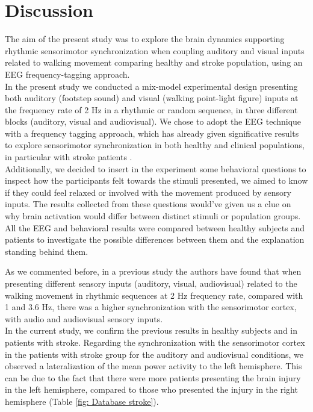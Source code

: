 \chapter{Discussion}
The aim of the present study was to explore the brain dynamics supporting rhythmic sensorimotor synchronization when coupling auditory and visual inputs related to walking movement comparing healthy and stroke population, using an EEG frequency-tagging approach. \\
In the present study we conducted a mix-model experimental design presenting both auditory (footstep sound) and visual (walking point-light figure) inputs at the frequency rate of 2 Hz in a rhythmic or random sequence, in three different blocks (auditory, visual and audiovisual). We chose to adopt the EEG technique with a frequency tagging approach, which has already given significative results to explore sensorimotor synchronization in both healthy \parencite{Cracco_2022} and clinical populations, in particular with stroke patients \parencite{Nozaradan_2017}. \\
Additionally, we decided to insert in the experiment some behavioral questions to inspect how the participants felt towards the stimuli presented, we aimed to know if they could feel relaxed or involved with the movement produced by sensory inputs. The results collected from these questions would've given us a clue on why brain activation would differ between distinct stimuli or population groups. \\
All the EEG and behavioral results were compared between healthy subjects and patients to investigate the possible differences between them and the explanation standing behind them.

As we commented before, in a previous study the authors have found that when presenting different sensory inputs (auditory, visual, audiovisual) related to the walking movement in rhythmic sequences at 2 Hz frequency rate, compared with 1 and 3.6 Hz, there was a higher synchronization with the sensorimotor cortex, with audio and audiovisual sensory inputs.\\
In the current study, we confirm the previous results in healthy subjects and in patients with stroke. Regarding the synchronization with the sensorimotor cortex in the patients with stroke group for the auditory and audiovisual conditions, we observed a lateralization of the mean power activity to the left hemisphere. This can be due to the fact that there were more patients presenting the brain injury in the left hemisphere, compared to those who presented the injury in the right hemisphere (Table \ref{fig: Database stroke}). 

